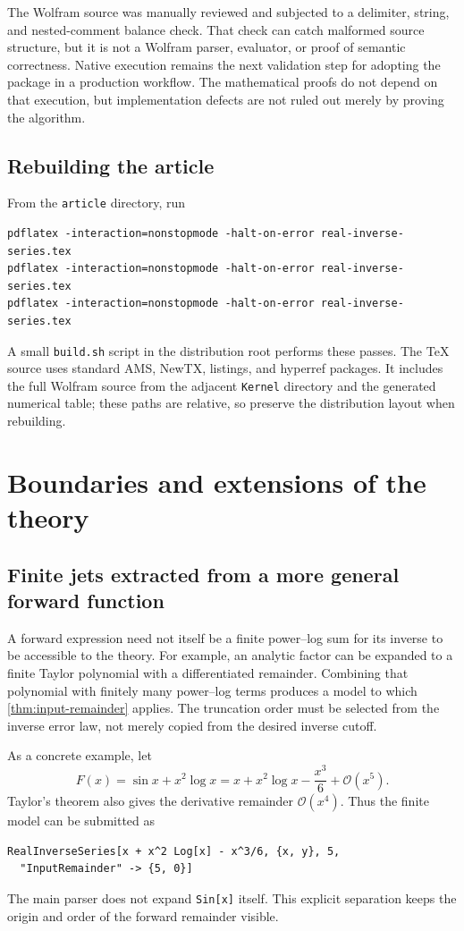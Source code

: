 \documentclass[11pt,a4paper]{article}
\numberwithin{equation}{section}
\theoremstyle{definition}
\newcommand{\OO}{\mathcal O}
\newcommand{\code}[1]{\texttt{#1}}
\begin{document}
The Wolfram source was manually reviewed and subjected to a delimiter,
string, and nested-comment balance check. That check can catch malformed
source structure, but it is not a Wolfram parser, evaluator, or proof of
semantic correctness. Native execution remains the next validation step
for adopting the package in a production workflow. The mathematical
proofs do not depend on that execution, but implementation defects are
not ruled out merely by proving the algorithm.

\subsection{Rebuilding the article}
From the \code{article} directory, run
\begin{lstlisting}
pdflatex -interaction=nonstopmode -halt-on-error real-inverse-series.tex
pdflatex -interaction=nonstopmode -halt-on-error real-inverse-series.tex
pdflatex -interaction=nonstopmode -halt-on-error real-inverse-series.tex
\end{lstlisting}
A small \code{build.sh} script in the distribution root performs these
passes. The TeX source uses standard AMS, NewTX, listings, and hyperref
packages. It includes the full Wolfram source from the adjacent
\code{Kernel} directory and the generated numerical table; these paths
are relative, so preserve the distribution layout when rebuilding.

\section{Boundaries and extensions of the theory}
\label{sec:extensions}

\subsection{Finite jets extracted from a more general forward function}
A forward expression need not itself be a finite power--log sum for its
inverse to be accessible to the theory. For example, an analytic factor
can be expanded to a finite Taylor polynomial with a differentiated
remainder. Combining that polynomial with finitely many power--log
terms produces a model to which \cref{thm:input-remainder} applies.
The truncation order must be selected from the inverse error law, not
merely copied from the desired inverse cutoff.

As a concrete example, let
\[
 F(x)=\sin x+x^2\log x
 =x+x^2\log x-\frac{x^3}{6}+\OO(x^5).
\]
Taylor's theorem also gives the derivative remainder $\OO(x^4)$.
Thus the finite model can be submitted as
\begin{lstlisting}
RealInverseSeries[x + x^2 Log[x] - x^3/6, {x, y}, 5,
  "InputRemainder" -> {5, 0}]
\end{lstlisting}
The main parser does not expand \code{Sin[x]} itself. This explicit
separation keeps the origin and order of the forward remainder visible.
\end{document}

